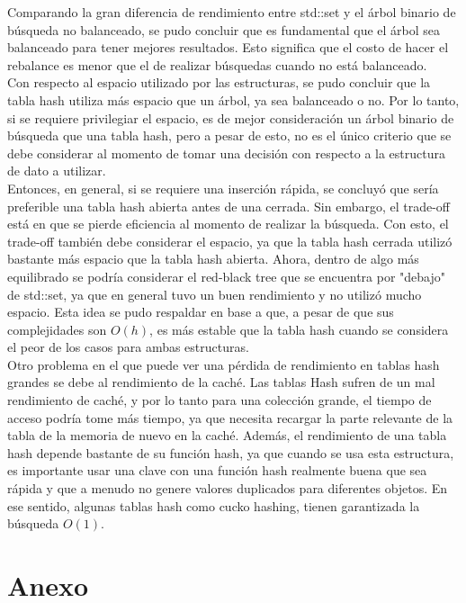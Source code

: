 \begin{multicols}{2}
Comparando la gran diferencia de rendimiento entre std::set y el árbol binario de búsqueda no balanceado, se pudo concluir que es fundamental que el árbol sea balanceado para tener mejores resultados. Esto significa que el costo de hacer el rebalance es menor que el de realizar búsquedas cuando no está balanceado.\\
Con respecto al espacio utilizado por las estructuras, se pudo concluir que la tabla hash utiliza más espacio que un árbol, ya sea balanceado o no. Por lo tanto, si se requiere privilegiar el espacio, es de mejor consideración un árbol binario de búsqueda que una tabla hash, pero a pesar de esto, no es el único criterio que se debe considerar al momento de tomar una decisión con respecto a la estructura de dato a utilizar.\\
Entonces, en general, si se requiere una inserción rápida, se concluyó que sería preferible una tabla hash abierta antes de una cerrada. Sin embargo, el trade-off está en que se pierde eficiencia al momento de realizar la búsqueda. Con esto, el trade-off también debe considerar el espacio, ya que la tabla hash cerrada utilizó bastante más espacio que la tabla hash abierta. Ahora, dentro de algo más equilibrado se podría considerar el red-black tree que se encuentra por "debajo" de std::set, ya que en general tuvo un buen rendimiento y no utilizó mucho espacio. Esta idea se pudo respaldar en base a que, a pesar de que sus complejidades son $O(h)$, es más estable que la tabla hash cuando se considera el peor de los casos para ambas estructuras.\\
Otro problema en el que puede ver una pérdida de rendimiento en tablas hash grandes se debe al rendimiento de la caché. Las tablas Hash sufren de un mal rendimiento de caché, y por lo tanto para una colección grande, el tiempo de acceso podría tome más tiempo, ya que necesita recargar la parte relevante de la tabla de la memoria de nuevo en la caché. Además, el rendimiento de una tabla hash depende bastante de su función hash, ya que cuando se usa esta estructura, es importante usar una clave con una función hash realmente buena que sea rápida y que a menudo no genere valores duplicados para diferentes objetos. En ese sentido, algunas tablas hash como cucko hashing, tienen garantizada la búsqueda $O(1)$.

\end{multicols}
\section{Anexo}
 
